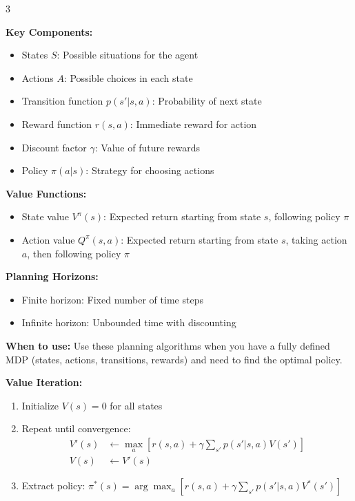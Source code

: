 \documentclass[10pt,landscape]{article}
\begin{document}
\begin{multicols}{3}
\begin{tcolorbox}[breakable, title=10. Markov Decision Processes Concepts, colback=mdp]
\textbf{Key Components:}
\begin{itemize}[leftmargin=*,noitemsep,topsep=0pt]
    \item States $S$: Possible situations for the agent
    \item Actions $A$: Possible choices in each state
    \item Transition function $p(s'|s,a)$: Probability of next state
    \item Reward function $r(s,a)$: Immediate reward for action
    \item Discount factor $\gamma$: Value of future rewards
    \item Policy $\pi(a|s)$: Strategy for choosing actions
\end{itemize}

\textbf{Value Functions:}
\begin{itemize}[leftmargin=*,noitemsep,topsep=0pt]
    \item State value $V^\pi(s)$: Expected return starting from state $s$, following policy $\pi$
    \item Action value $Q^\pi(s,a)$: Expected return starting from state $s$, taking action $a$, then following policy $\pi$
\end{itemize}

\textbf{Planning Horizons:}
\begin{itemize}[leftmargin=*,noitemsep,topsep=0pt]
    \item Finite horizon: Fixed number of time steps
    \item Infinite horizon: Unbounded time with discounting
\end{itemize}
\end{tcolorbox}

\begin{tcolorbox}[breakable, title=10.1 MDP Planning Algorithms, colback=mdp]
\textbf{When to use:} Use these planning algorithms when you have a fully defined MDP (states, actions, transitions, rewards) and need to find the optimal policy.

\textbf{Value Iteration:}
\begin{enumerate}[leftmargin=*,noitemsep,topsep=0pt]
    \item Initialize $V(s) = 0$ for all states
    \item Repeat until convergence:
    \begin{align}
    V'(s) &\leftarrow \max_a \left[r(s, a) + \gamma \sum_{s'} p(s'|s, a)V(s')\right]\\
    V(s) &\leftarrow V'(s)
    \end{align}
    \item Extract policy: 
    $\pi^*(s) = \arg\max_a \left[r(s, a) + \gamma \sum_{s'} p(s'|s, a)V^*(s')\right]$
\end{enumerate}


\end{tcolorbox}
\end{multicols}
\end{document}
